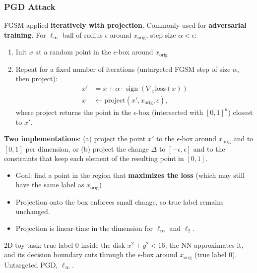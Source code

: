 \subsubsection{PGD Attack}
FGSM applied \textbf{iteratively with projection}. Commonly used for
\textbf{adversarial training}. For $\ell_\infty$ ball of radius $\epsilon$ around $x_\text{orig}$, step size $\alpha < \epsilon$:
\begin{enumerate}
  \item Init $x$ at a random point in the $\epsilon$-box around $x_\text{orig}$
  \item Repeat for a fixed number of iterations (untargeted FGSM step of size $\alpha$, then project):
    \[
      \begin{aligned}
        x' &= x + \alpha \cdot \operatorname{sign}(\nabla_x \text{loss}(x)) \\
        x &\leftarrow \text{project}(x', x_\text{orig}, \epsilon),
      \end{aligned}
    \]
    where $\text{project}$ returns the point in the $\epsilon$-box (intersected with $[0,1]^n$) closest to $x'$.
\end{enumerate}
\textbf{Two implementations}: (a) project the point $x'$ to the $\epsilon$-box around $x_\text{orig}$ and to $[0,1]$
per dimension, or (b) project the change $\Delta$ to $[-\epsilon, \epsilon]$ and to the constraints that keep
each element of the resulting point in $[0,1]$.

\begin{itemize}
  \item Goal: find a point in the region that \textbf{maximizes the loss} (which may still have the same label as $x_\text{orig}$)
  \item Projection onto the box enforces small change, so true label remains unchanged.
  \item Projection is linear-time in the dimension for $\ell_\infty$ and $\ell_2$.
\end{itemize}

\example{} 2D toy task: true label 0 inside the disk $x^2+y^2<16$; the NN approximates it, and its
decision boundary cuts through the $\epsilon$-box around $x_\text{orig}$ (true label 0). Untargeted PGD, $\ell_\infty$.

